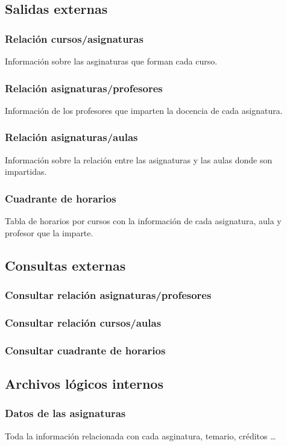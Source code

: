 \documentclass[11pt,a4paper,spanish,twoside]{book}
\begin{document}
\subsection{Salidas externas}
\subsubsection{Relación cursos/asignaturas}
Información sobre las asginaturas que forman cada curso.

\subsubsection{Relación asignaturas/profesores}
Información de los profesores que imparten la docencia de cada asignatura.

\subsubsection{Relación asignaturas/aulas}
Información sobre la relación entre las asignaturas y las aulas donde son
impartidas. 

\subsubsection{Cuadrante de horarios}
Tabla de horarios por cursos con la información de cada asignatura, aula y
profesor que la imparte.

\subsection{Consultas externas}
\subsubsection{Consultar relación asignaturas/profesores}

\subsubsection{Consultar relación cursos/aulas}
\subsubsection{Consultar cuadrante de horarios}

\subsection{Archivos lógicos internos}
\subsubsection{Datos de las asignaturas}
Toda la información relacionada con cada asginatura, temario, créditos \dots
\end{document}
